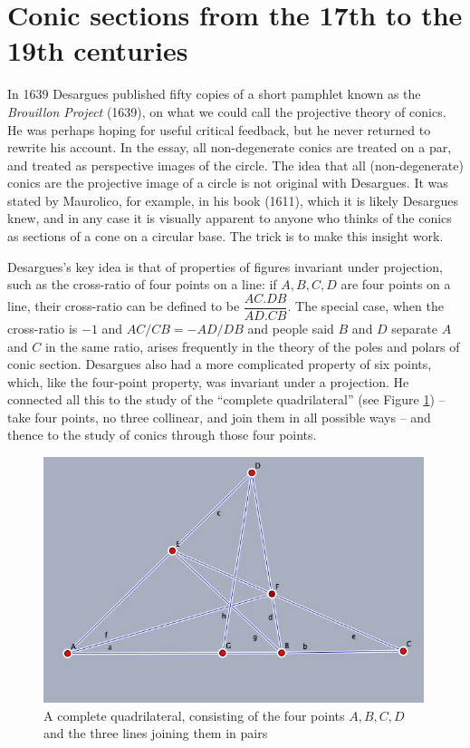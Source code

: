 \section{Conic sections from the 17th to the 19th centuries}
In 1639 Desargues published fifty copies of a short pamphlet known as the \emph{Brouillon Project} (1639), on what we could call the projective theory of conics. He was perhaps hoping for useful critical feedback, but he never returned to rewrite his account.  In the essay, all non-degenerate conics are treated on a par, and treated as perspective images of the circle. The idea that all (non-degenerate) conics are the projective image of a circle is not original with Desargues. It was stated by Maurolico, for example, in his book  (1611), which it is likely Desargues knew, and in any case it is visually apparent to anyone who thinks of the conics as sections of a cone on a circular base. The trick is to make this insight work.

Desargues's key idea is that of properties of figures invariant under projection, such as the cross-ratio of four points on a line: if $A,  B, C, D$ are four points on a line, their cross-ratio can be defined to be
$\dfrac{AC.DB}{AD.CB}$. The special case,  when the cross-ratio is $-1$ and $AC/CB=-AD/DB$ and people said $B$ and $D$ separate $A$ and $C$ in the same ratio, arises frequently in the theory of the poles and polars of conic section. Desargues also had a more complicated property of six points, which, like the four-point property, was invariant under a projection. He connected all this to the study of the ``complete quadrilateral'' (see Figure \ref{figCompleteQuad}) -- take four points, no three collinear, and join them in all possible ways --  and thence to the study of conics through those four points. 

\bigskip
\begin{center}
    \begin{figure}
   \begin{center}  \includegraphics[width=30em]{CompleteQuad3.png} 
   \end{center}
     \protect \caption{A complete quadrilateral, consisting of the four points $A, B, C, D$ and the three lines joining them in pairs}
      \label{figCompleteQuad}
     \end{figure}
\end{center}

